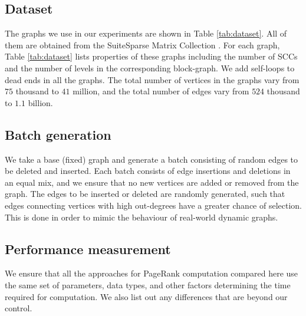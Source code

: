 \subsection{Dataset}

The graphs we use in our experiments are shown in Table \ref{tab:dataset}. All of them are obtained from the SuiteSparse Matrix Collection \cite{suite19}. For each graph, Table \ref{tab:dataset} lists properties of these graphs including the number of SCCs and the number of levels in the corresponding block-graph. We add self-loops to dead ends in all the graphs. The total number of vertices in the graphs vary from $75$ thousand to $41$  million, and the total number of edges vary from $524$ thousand to $1.1$ billion.






\subsection{Batch generation}

We take a base (fixed) graph and generate a batch consisting of random edges to be deleted and inserted. Each batch consists of edge insertions and deletions in an equal mix, and we ensure that no new vertices are added or removed from the graph. The edges to be inserted or deleted are randomly generated, such that edges connecting vertices with high out-degrees have a greater chance of selection. This is done in order to mimic the behaviour of real-world dynamic graphs.






\subsection{Performance measurement}

We ensure that all the approaches for PageRank computation compared here use the same set of parameters, data types, and other factors determining the time required for computation. We also list out any differences that are beyond our control.

